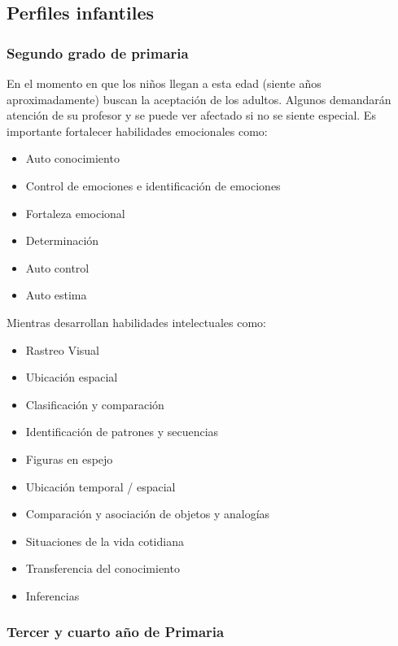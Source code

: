 \documentclass[letterpaper,10pt]{article}
\begin{document}
\subsection{Perfiles infantiles}
\subsubsection{Segundo grado de primaria}

En el momento en que los niños llegan a esta edad (siente años aproximadamente) 
buscan la aceptación de los adultos.  Algunos 
demandarán atención de su profesor y se puede ver afectado si no se siente especial. 
Es importante fortalecer habilidades emocionales como:
\begin{itemize}
	\item Auto conocimiento
	\item Control de emociones e identificación de emociones
	\item Fortaleza emocional
	\item Determinación
	\item Auto control
	\item Auto estima
\end{itemize}
Mientras desarrollan habilidades intelectuales como:
\begin{itemize}
	\item Rastreo Visual
	\item Ubicación espacial
	\item Clasificación y comparación
	\item Identificación de patrones y secuencias
	\item Figuras en espejo
	\item Ubicación temporal / espacial
	\item Comparación y asociación de objetos y analogías
	\item Situaciones de la vida cotidiana
	\item Transferencia del conocimiento
	\item Inferencias

\end{itemize}
\subsubsection{Tercer y cuarto año de Primaria}
\end{document}
